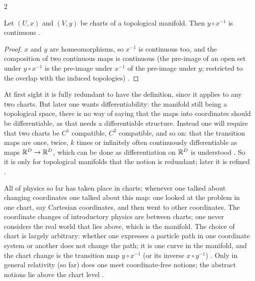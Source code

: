 \begin{paracol}{2}
\begin{proposition}\label{prop:mf-c0}
Let $(U,x)$ and $(V,y)$ be charts of a topological manifold. Then $y\circ x^{-1}$ is continuous .
\end{proposition}
\begin{proof}
$x$ and $y$ are homeomorphisms, so $x^{-1}$ is continuous too, and the composition of two continuous maps is continuous (the pre-image of an open set under $y\circ x^{-1}$ is the pre-image under $x^{-1}$ of the pre-image under $y$; restricted to the overlap
with the induced topologies) .
\end{proof}
At first sight it is fully redundant to have the definition, since it applies to any two charts. But later one wants differentiability: the manifold still being a topological space, there is no way of saying that the maps into coordinates should be differentiable, as that needs a differentiable structure. Instead
one will require that two charts be $C^1$ compatible, $C^2$ compatible, and so on: that the transition maps are once, twice, $k$ times or infinitely often continuously differentiable as maps $\mathbb{R}^D\to\mathbb{R}^D$, which can be done as differentiation on $\mathbb{R}^D$ is understood
. So it is only for topological manifolds that the notion is redundant; later it is refined .

All of physics so far has taken place in charts; whenever one talked about changing coordinates one talked about this map: one looked at the problem in one chart, say Cartesian coordinates, and then went to other coordinates. The coordinate changes of introductory physics are between charts;
one never considers the real world that lies above, which is the manifold. The choice of chart is largely arbitrary: whether one expresses a particle path in one coordinate system or another does not change the path; it is one curve in the manifold, and the chart change is the transition map $y\circ x^{-1}$ (or its inverse $x\circ y^{-1}$)
. Only in general relativity (so far) does one meet coordinate-free notions; the abstract notions lie above the chart level .


\end{paracol}
